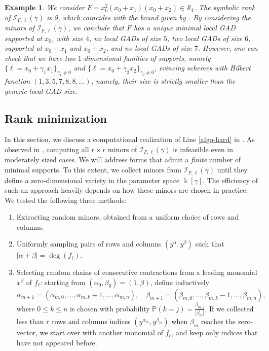 \documentclass{amsart}
\theoremstyle{plain}
\newtheorem{example}[example]{Example}
\renewcommand{\k}{\Bbbk}
\renewcommand{\S}{\mathcal{S}}
\renewcommand{\P}{\mathbb{P}}
\def\a{\alpha}
\def\b{\beta}
\def\c{\gamma}
\def\P{{\mathbb{P}}}
\numberwithin{equation}{section}
\begin{document}
\begin{example} \label{ex:funnymonomial}
    We consider $F = x_0^2(x_0+x_1)(x_0+x_2) \in \S_4$.
    The symbolic rank of $\mathcal{I}_{F,\ell}(\c)$ is 9, which coincides with the bound given by .
    By considering the minors of $\mathcal{I}_{F,\ell}(\c)$, we conclude that $F$ has a unique minimal local GAD supported at $x_0$, with size $4$, no local GADs of size $5$, two local GADs of size $6$, supported at $x_0+x_1$ and $x_0+x_2$, and no local GADs of size $7$.
    However, one can check that we have two $1$-dimensional families of supports, namely $\{ \ell=x_0+\c_1 x_1 \}_{\c_1 \neq 0}$ and $\{ \ell = x_0+\c_2 x_2 \}_{\c_2 \neq 0}$, evincing schemes with Hilbert function $(1,3,5,7,8,8, \dots)$, namely, their size is strictly smaller than the generic local GAD size.
\end{example}


\subsection{Rank minimization} \label{sec:RankMinimiz}

In this section, we discuss a computational realization of Line \ref{algo-hard} in .
As observed in , computing all $r \times r$ minors of $\mathcal{I}_{F,\ell}(\gamma)$ is infeasible even in moderately sized cases.
We will address forms that admit a \emph{finite} number of minimal supports. %
To this extent, we collect minors from $\mathcal{I}_{F,\ell}(\gamma)$ until they define a zero-dimensional variety in the parameter space $\k[\gamma]$.
The efficiency of such an approach heavily depends on how these minors are chosen in practice.
We tested the following three methods:
\begin{enumerate}[leftmargin=0.7cm]
    \item[(A)] Extracting random minors, obtained from a uniform choice of rows and columns.
    \item[(B)] Uniformly sampling pairs of rows and columns $(y^\a,y^\b)$ such that $|\a+\b|=\deg(f_{\ell})$.
    \item[(C)] Selecting random chains of consecutive contractions from a leading monomial $x^{\b}$ of $f_{\ell}$: starting from $(\a_0,\b_0)=(1,\b)$, define inductively 
    \[ \a_{m+1} = (\a_{m,0}, \dots, \a_{m,k}+1, \dots, \a_{m,n}), \quad \b_{m+1} = (\b_{m,0}, \dots, \b_{m,k}-1, \dots, \b_{m,n}), \]
    where $0 \leq k \leq n$ is chosen with probability $\P(k = j) = \frac{ \beta_{m,j} }{|\b_m|}$.
    If we collected less than $r$ rows and columns indices $(y^{\a_m},y^{\b_m})$ when $\b_m$ reaches the zero-vector, we start over with another monomial of $f_{\ell}$, and keep only indices that have not appeared before.
\end{enumerate}
\end{document}
